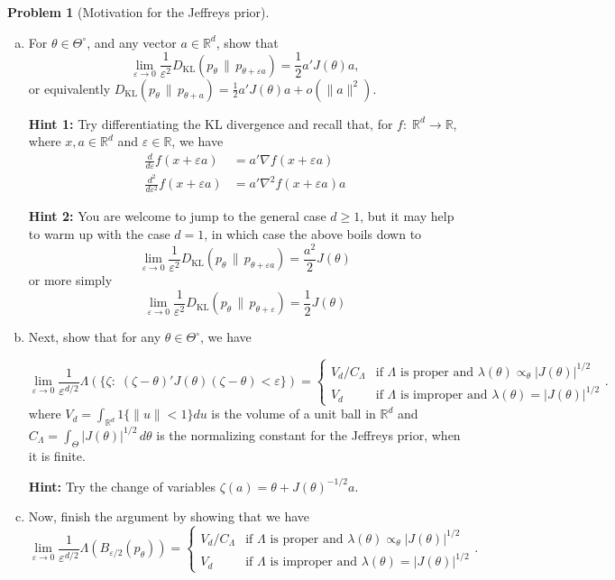 \documentclass{article}
\newcommand{\RR}{\mathbb{R}}
\newcommand{\ep}{\varepsilon}
\theoremstyle{definition}
\newtheorem{problem}{Problem}
\begin{document}
\begin{problem}[Motivation for the Jeffreys prior]
\begin{enumerate}[(a)]
\item For $\theta\in\Theta^{\circ}$, and any vector $a\in\RR^d$, show that 
  \begin{equation}
    \label{eq:lim-ratio}
\lim_{\ep\to 0} \frac{1}{\ep^2} D_{\text{KL}}(p_{\theta} \,\|\, p_{\theta + \ep a}) = \frac{1}{2}a'J(\theta)a,
\end{equation}
or equivalently $D_{\text{KL}}(p_{\theta} \,\|\, p_{\theta + a}) = \frac{1}{2}a'J(\theta)a + o(\|a\|^2)$.

{\bf Hint 1:} Try differentiating the KL divergence and recall that, for $f:\;\RR^d\to\RR$, where $x,a\in \RR^d$ and $\ep \in \RR$, we have
\begin{align*}
  \frac{d}{d\ep}f(x+\ep a) &= a'\nabla f(x+\ep a)\\
  \frac{d^2}{d\ep^2}f(x+\ep a) &= a'\nabla^2 f(x+\ep a)a
\end{align*}

{\bf Hint 2:} You are welcome to jump to the general case $d\geq 1$, but it may help to warm up with the case $d=1$, in which case the above boils down to
\[
\lim_{\ep\to 0} \frac{1}{\ep^2} D_{\text{KL}}(p_{\theta} \,\|\, p_{\theta + \ep a}) = \frac{a^2}{2}J(\theta)
\]
or more simply
\[
\lim_{\ep\to 0} \frac{1}{\ep^2} D_{\text{KL}}(p_{\theta} \,\|\, p_{\theta + \ep}) = \frac{1}{2}J(\theta)
\]





\item Next, show that for any $\theta\in\Theta^{\circ}$, we have

\[
\lim_{\ep\to 0}\frac{1}{\ep^{d/2}} \Lambda\left(\{\zeta:\; (\zeta - \theta)'J(\theta)(\zeta - \theta) < \ep\}\right) = \begin{cases} V_d/C_\Lambda &\text{if } \Lambda \text{ is proper and } \lambda(\theta) \propto_\theta |J(\theta)|^{1/2}\\ V_d &\text{if } \Lambda \text{ is improper and } \lambda(\theta) = |J(\theta)|^{1/2}\end{cases}.
\]
where $V_d = \int_{\RR^d}1\{\|u\|<1\} du$ is the volume of a unit ball in $\RR^d$ and $C_\Lambda = \int_{\Theta} |J(\theta)|^{1/2} \,d\theta$ is the normalizing constant for the Jeffreys prior, when it is finite.

{\bf Hint:} Try the change of variables $\zeta(a) = \theta + J(\theta)^{-1/2}a$.



\item Now, finish the argument by showing that we have
  \[
  \lim_{\ep\to 0} \frac{1}{\ep^{d/2}} \Lambda(B_{\ep/2}(p_\theta)) = \begin{cases} V_d/C_\Lambda &\text{if } \Lambda \text{ is proper and } \lambda(\theta) \propto_\theta |J(\theta)|^{1/2}\\ V_d &\text{if } \Lambda \text{ is improper and } \lambda(\theta) = |J(\theta)|^{1/2}\end{cases}.
  \]


\end{enumerate}
\end{problem}
\end{document}

